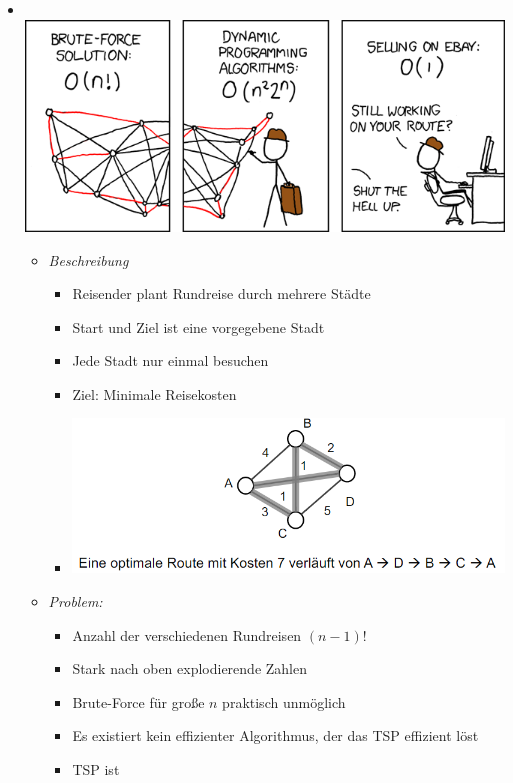 \documentclass[
    12pt,
    a4paper,
    ngerman,
    color=3b,%
    marginpar=false,
    colorback=false,
    leqno,
]{tudaexercise}
\begin{document}
\begin{itemize}
          \pagebreak

    \item {}\\
          \includegraphics[width=.5\textwidth]{pictures/traveling_salesman.png}
    \begin{itemize}
              \item \textit{Beschreibung}
                    \begin{itemize}
                        \item Reisender plant Rundreise durch mehrere Städte
                        \item Start und Ziel ist eine vorgegebene Stadt
                        \item Jede Stadt nur einmal besuchen
                        \item Ziel: Minimale Reisekosten
                        \item[] \includegraphics[width=12cm]{pictures/tsp1.PNG}
                    \end{itemize}
              \item \textit{Problem:}
                    \begin{itemize}
                        \item Anzahl der verschiedenen Rundreisen $(n-1)!$
                        \item Stark nach oben explodierende Zahlen
                        \item Brute-Force für große $n$ praktisch unmöglich
                        \item Es existiert kein effizienter Algorithmus, der das TSP effizient löst
                        \item TSP ist 

\end{itemize}
\end{itemize}
\end{itemize}
\end{document}
